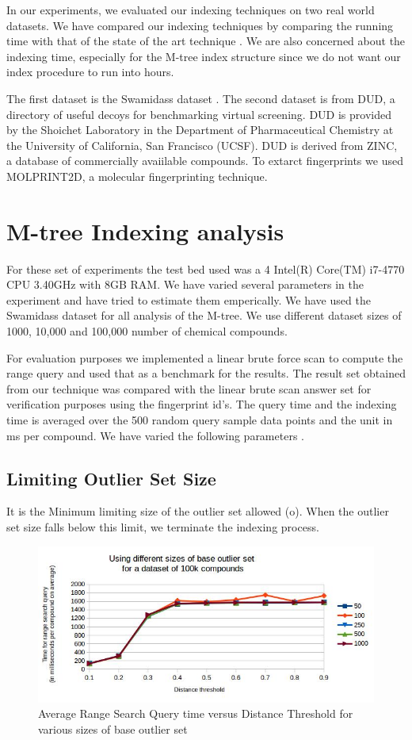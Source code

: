 
In our experiments, we evaluated our indexing techniques on two real world datasets. We have compared our indexing techniques by comparing the running time with that of the state of the art technique . We are also concerned about the indexing time, especially for the M-tree index structure since we do not want our index procedure to run into hours.

The first dataset is the Swamidass dataset . The second dataset is from DUD, a directory of useful decoys for benchmarking virtual screening. DUD is provided by the Shoichet Laboratory in the Department of Pharmaceutical Chemistry at the University of California, San Francisco (UCSF). DUD is derived from ZINC, a database of commercially avaiilable compounds. To extarct fingerprints we used MOLPRINT2D, a molecular fingerprinting technique.


\section{M-tree Indexing analysis}	

For these set of experiments the test bed used was a 4 Intel(R) Core(TM) i7-4770 CPU \@ 3.40GHz with 8GB RAM. We have varied several parameters in the experiment and have tried to estimate them emperically. We have used the Swamidass dataset for all analysis of the M-tree. We use different dataset sizes of 1000, 10,000 and 100,000 number of chemical compounds.

For evaluation purposes we implemented a linear brute force scan to compute the range query and used that as a benchmark for the results. The result set obtained from our technique was compared with the linear brute scan answer set for verification purposes using the fingerprint id's. The query time and the indexing time is averaged over the 500 random query sample data points and the unit in ms per compound. We have varied the following parameters .


\subsection{Limiting Outlier Set Size }

It is the Minimum limiting size of the outlier set allowed (o). When the outlier set size falls below this limit, we terminate the indexing process.

\begin{figure}[ht]	
\centering
\includegraphics[width=1 \columnwidth]{img/image1.jpg}
\caption{Average Range Search Query time versus Distance Threshold for various sizes of base outlier set}
\label{fig:5.1}
\end{figure}

